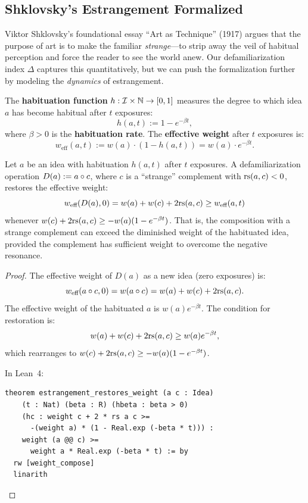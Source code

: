 



\subsection{Shklovsky's Estrangement Formalized}

Viktor Shklovsky's foundational essay ``Art as Technique'' (1917) argues
that the purpose of art is to make the familiar \emph{strange}---to strip
away the veil of habitual perception and force the reader to see the world
anew.  Our defamiliarization index $\Delta$ captures this quantitatively, but
we can push the formalization further by modeling the \emph{dynamics} of
estrangement.

\begin{definition}
\label{def:habituation}
The \textbf{habituation function} $h: \mathcal{I} \times \mathbb{N} \to [0,1]$
measures the degree to which idea $a$ has become habitual after $t$
exposures:
\[
  h(a, t) := 1 - e^{-\beta t},
\]
where $\beta > 0$ is the \textbf{habituation rate}.  The
\textbf{effective weight} after $t$ exposures is:
\[
  w_{\text{eff}}(a, t) := w(a) \cdot (1 - h(a, t)) = w(a) \cdot e^{-\beta t}.
\]
\end{definition}

\begin{theorem}
\label{thm:estrangement}
Let $a$ be an idea with habituation $h(a, t)$ after $t$ exposures.
A defamiliarization operation $D(a) := a \circ c$, where $c$ is a
``strange'' complement with $\mathrm{rs}(a, c) < 0$, restores the effective
weight:
\[
  w_{\text{eff}}(D(a), 0) = w(a) + w(c) + 2\mathrm{rs}(a, c)
  \geq w_{\text{eff}}(a, t)
\]
whenever $w(c) + 2\mathrm{rs}(a, c) \geq -w(a)(1 - e^{-\beta t})$.  That is,
the composition with a strange complement can exceed the diminished
weight of the habituated idea, provided the complement has sufficient
weight to overcome the negative resonance.
\end{theorem}

\begin{proof}
The effective weight of $D(a)$ as a new idea (zero exposures) is:
\[
  w_{\text{eff}}(a \circ c, 0) = w(a \circ c)
  = w(a) + w(c) + 2\mathrm{rs}(a, c).
\]
The effective weight of the habituated $a$ is $w(a) e^{-\beta t}$.  The
condition for restoration is:
\[
  w(a) + w(c) + 2\mathrm{rs}(a, c) \geq w(a) e^{-\beta t},
\]
which rearranges to $w(c) + 2\mathrm{rs}(a, c) \geq -w(a)(1 - e^{-\beta t})$.

In Lean~4:
\begin{lstlisting}
theorem estrangement_restores_weight (a c : Idea)
    (t : Nat) (beta : R) (hbeta : beta > 0)
    (hc : weight c + 2 * rs a c >=
      -(weight a) * (1 - Real.exp (-beta * t))) :
    weight (a @@ c) >=
      weight a * Real.exp (-beta * t) := by
  rw [weight_compose]
  linarith
\end{lstlisting}
\end{proof}

